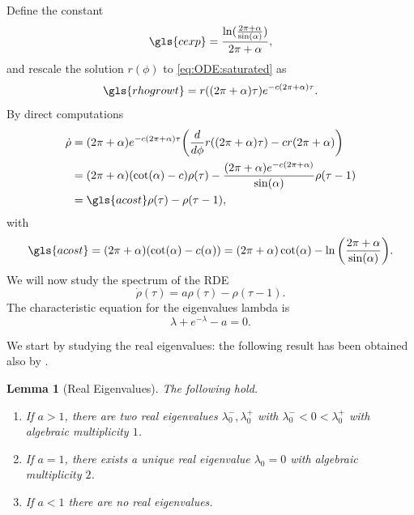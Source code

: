 \documentclass[reqno]{amsart}
\theoremstyle{definition} \newtheorem{definition}{Definition}[section]
\theoremstyle{definition} \newtheorem{remark}[definition]{Remark}
\theoremstyle{plain} \newtheorem{lemma}[definition]{Lemma}
\theoremstyle{plain} \newtheorem{proposition}[definition]{Proposition}
\theoremstyle{plain} \newtheorem{theorem}[definition]{Theorem}
\theoremstyle{plain} \newtheorem{corollary}[definition]{Corollary}
\theoremstyle{definition} \newtheorem{example}[definition]{Example}
\theoremstyle{plain} \newtheorem{claim}[clai]{Claim}
\theoremstyle{definition} \newtheorem{assumption}[definition]{Assumption}
\theoremstyle{definition} \newtheorem{observation}[definition]{Observation}
\newcommand{\1}{\mathbbm 1}
\numberwithin{equation}{section} %
\theoremstyle{plain} \newtheorem*{theorem*}{Theorem}
\theoremstyle{plain} \newtheorem{mthm}[maintheorem]{Main Theorem}
\theoremstyle{plain} \newtheorem*{mthm*}{Main Theorem}
\theoremstyle{plain} \newtheorem*{conjecture*}{Conjecture}
\theoremstyle{plain} \newtheorem{conjecture}[definition]{Conjecture}
\theoremstyle{plain} \newtheorem*{problem*}{Problem}
\begin{document}
Define the constant 
\begin{equation}
\label{Equa:c_gene_defi}
\gls{cexp} = \frac{\ln(\frac{2\pi+\alpha}{\sin(\alpha)})}{2\pi+\alpha},
\end{equation}
and rescale the solution $r(\phi)$ to \eqref{eq:ODE:saturated} as 
\begin{equation}
\label{Equa:rho_deff}
\gls{rhogrowt} = r((2\pi + \alpha) \tau) e^{-c (2\pi+\alpha) \tau}.
\end{equation}
By direct computations 
\begin{align*}
\dot \rho &= (2\pi + \alpha) e^{-c (2\pi + \alpha) \tau} \bigg( \frac{d}{d\phi} r((2\pi + \alpha) \tau) - c r(2\pi + \alpha) \bigg) \\
&= (2\pi + \alpha) (\cot(\alpha) - c) \rho(\tau) - \frac{(2\pi + \alpha) e^{- c(2\pi + \alpha)}}{\sin(\alpha)} \rho(\tau-1) \\
&= \gls{acost} \rho(\tau) - \rho(\tau - 1),
\end{align*}
with
\begin{equation}
\label{Equa:a_const}
\gls{acost} = (2\pi + \alpha) (\cot(\alpha) - c(\alpha)) = (2\pi + \alpha) \cot(\alpha) - \ln \bigg( \frac{2\pi + \alpha}{\sin(\alpha)} \bigg).
\end{equation}
We will now study the spectrum of the RDE
\begin{equation}
\label{Equa:rescal_RDE}
\dot \rho(\tau) = a \rho(\tau) - \rho(\tau-1).
\end{equation}
The characteristic equation for the eigenvalues  \gls{lambda} is
\begin{equation}
\label{eq:eigenvalues}
\lambda + e^{-\lambda} - a = 0.
\end{equation}

We start by studying the real eigenvalues: the following result has been obtained also by \cite{Bressan_friends,firefighter}.

\begin{lemma}[Real Eigenvalues]
\label{lem:real:Eigenvalues}
The following hold.
\begin{enumerate}
\item If $a > 1$, there are two real eigenvalues $\lambda_0^-,\lambda_0^+$ with $\lambda_0^- < 0 < \lambda_0^+$ with algebraic multiplicity $1$.
\item If $a = 1$, there exists a unique real eigenvalue $\lambda_0 = 0$ with algebraic multiplicity $2$.
\item If $a < 1$ there are no real eigenvalues.
\end{enumerate}
\end{lemma}
\end{document}
